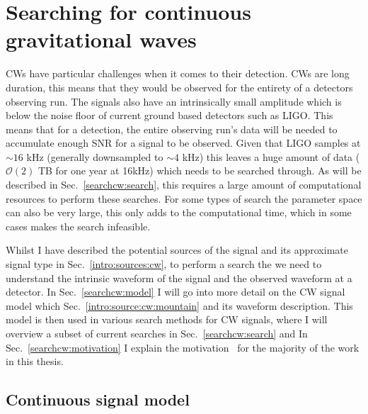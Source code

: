 \chapter{\label{searchcw}Searching for continuous gravitational waves}

\glspl{CW} have
particular challenges when it comes to their detection.  \glspl{CW} are long
duration, this means that they would be observed for the entirety of a
detectors observing run.  The signals also have an intrinsically small
amplitude which is below the noise floor of current ground based detectors such
as \gls{LIGO}.  This means that for a detection, the entire observing
run's data will be needed to
accumulate enough \gls{SNR} for a signal to be observed.  Given that \gls{LIGO}
samples at $\sim 16$ kHz (generally downsampled to $\sim 4$ kHz) this leaves a
huge amount of data ($\mathcal{O}(2)$ TB for one year at 16kHz) which needs to be searched through.  As will be described in Sec.~\ref{searchcw:search}, this
requires a large amount of computational resources to perform these searches.
For some types of search the parameter space can also be very large, this only
adds to the computational time, which in some cases makes the search
infeasible.

Whilst I have described the potential sources of the signal and its approximate
signal type in Sec.~\ref{intro:sources:cw}, to perform a search the we need to understand the
intrinsic waveform of the signal and the observed waveform at a detector.  In 
Sec.~\ref{searchcw:model} I will go into more
detail on the \gls{CW} signal model which Sec.~\ref{intro:source:cw:mountain} and its
waveform description.  This model is then used in various search methods for
\gls{CW} signals, where I will overview a subset of current searches in
Sec.~\ref{searchcw:search} and In 
Sec.~\ref{searchcw:motivation} I explain the motivation~ for the majority of the work in this thesis.

\section{\label{searchcw:model}Continuous signal model}

